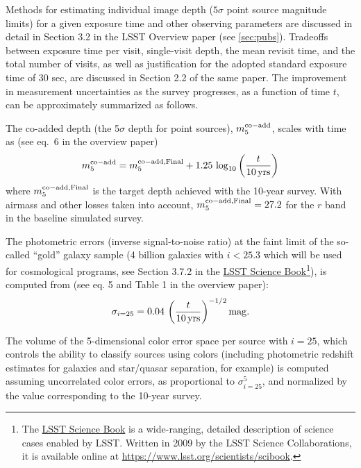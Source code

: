 \documentclass[DM,toc,usenatbib]{lsstdoc}
\begin{document}
Methods for estimating individual image depth ($5\sigma$ point source magnitude limits) for a given 
exposure time and other observing parameters
are discussed in detail in Section 3.2 in the LSST Overview paper (see \ref{sec:pubs}). Tradeoffs between 
exposure time per visit, single-visit depth, the mean revisit time, and the total number of visits,
as well as justification for the adopted standard exposure time of 30 sec, are discussed in Section 
2.2 of the same paper. The improvement in measurement uncertainties as the survey progresses,
as a function of time $t$, can be approximately summarized as follows. 

The co-added depth (the 5$\sigma$ depth for point sources), $m_5^{\rm co-add}$, scales 
with time as (see eq.~6 in the overview paper)  
\begin{equation} 
         m_5^{\rm co-add}  = m_5^{\rm co-add, Final}  + 1.25 \, \log_{10}\left({t \over 10 \, {\rm yrs}}\right) 
\end{equation} 
where $m_5^{\rm co-add, Final}$ is the target depth achieved with the 10-year survey. With
airmass and other losses taken into account, $m_5^{\rm co-add, Final}=27.2$ for the $r$ band
in the baseline simulated survey. 

The photometric errors (inverse signal-to-noise ratio) at the faint limit of the so-called 
``gold'' galaxy sample (4 billion galaxies with $i<25.3$ which will be used for cosmological
programs, see Section 3.7.2 in the \href{https://www.lsst.org/scientists/scibook}{LSST Science Book}\footnote{The 
\href{https://www.lsst.org/scientists/scibook}{LSST Science Book} 
is a wide-ranging, detailed description of science cases enabled by LSST. Written in 2009 by the LSST Science Collaborations, it is available online
at \href{https://www.lsst.org/scientists/scibook}{https://www.lsst.org/scientists/scibook}.}), is computed from (see eq. 5 and Table 1 
in the overview paper):
\begin{equation} 
                \sigma_{i=25} = 0.04 \, \left({t \over 10 \, {\rm yrs}}\right)^{-1/2} {\rm mag.}
\end{equation}

The volume of the 5-dimensional color error space per source with $i=25$,  which controls the ability 
to classify sources using colors (including photometric redshift estimates for galaxies and star/quasar
separation, for example) is computed assuming uncorrelated color errors, as proportional
to $\sigma^5_{i=25}$, and normalized by the value corresponding to the 10-year survey. 
\end{document}
